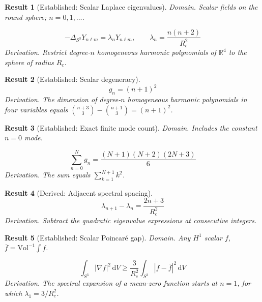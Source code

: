 \documentclass[aps,prd,onecolumn,notitlepage,groupedaddress,11pt]{revtex4-2}
\newtheorem{result}{Result}
\begin{document}
\begin{result}[\textsf{Established}: Scalar Laplace eigenvalues]\label{res:13}
\textit{Domain.} Scalar fields on the round sphere; $n=0,1,\ldots$.\par
\begin{equation}\label{eq:13}
-\Delta_{S^3}Y_{n\ell m}=\lambda_nY_{n\ell m},\qquad\lambda_n=\frac{n(n+2)}{R_c^2}
\end{equation}
\textit{Derivation.} Restrict degree-$n$ homogeneous harmonic polynomials of $\mathbb R^4$ to the sphere of radius $R_c$.
\end{result}

\begin{result}[\textsf{Established}: Scalar degeneracy]\label{res:14}
\begin{equation}\label{eq:14}
g_n=(n+1)^2
\end{equation}
\textit{Derivation.} The dimension of degree-$n$ homogeneous harmonic polynomials in four variables equals $\binom{n+3}{3}-\binom{n+1}{3}=(n+1)^2$.
\end{result}

\begin{result}[\textsf{Established}: Exact finite mode count]\label{res:15}
\textit{Domain.} Includes the constant $n=0$ mode.\par
\begin{equation}\label{eq:15}
\sum_{n=0}^{N}g_n=\frac{(N+1)(N+2)(2N+3)}6
\end{equation}
\textit{Derivation.} The sum equals $\sum_{k=1}^{N+1}k^2$.
\end{result}

\begin{result}[\textsf{Derived}: Adjacent spectral spacing]\label{res:16}
\begin{equation}\label{eq:16}
\lambda_{n+1}-\lambda_n=\frac{2n+3}{R_c^2}
\end{equation}
\textit{Derivation.} Subtract the quadratic eigenvalue expressions at consecutive integers.
\end{result}

\begin{result}[\textsf{Established}: Scalar Poincar\'e gap]\label{res:17}
\textit{Domain.} Any $H^1$ scalar $f$, $\overline f=\mathrm{Vol}^{-1}\int f$.\par
\begin{equation}\label{eq:17}
\int_{S^3}|\nabla f|^2\,\mathrm dV\ge\frac3{R_c^2}\int_{S^3}|f-\overline f|^2\,\mathrm dV
\end{equation}
\textit{Derivation.} The spectral expansion of a mean-zero function starts at $n=1$, for which $\lambda_1=3/R_c^2$.
\end{result}
\end{document}
